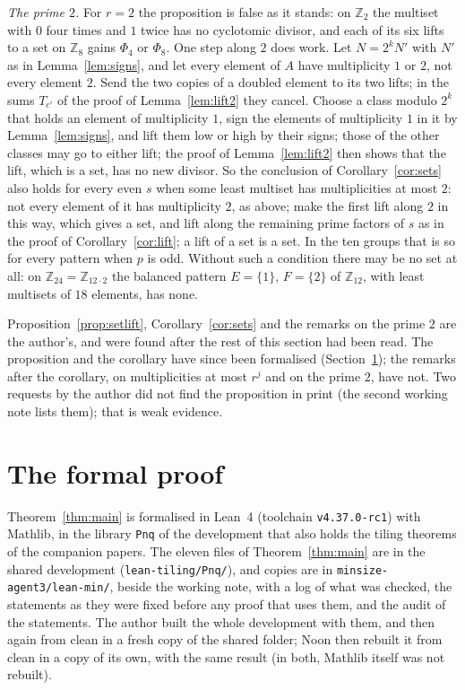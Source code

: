 \documentclass[11pt,a4paper]{amsart}
\theoremstyle{definition}
\theoremstyle{remark}
\newcommand{\Z}{\mathbb{Z}}
\newcommand{\lean}[1]{\texttt{#1}}
\begin{document}
\emph{The prime $2$.} For $r=2$ the proposition is false as it stands: on $\Z_2$ the multiset with $0$ four times and $1$
twice has no cyclotomic divisor, and each of its six lifts to a set on $\Z_8$ gains $\Phi_4$ or $\Phi_8$. One step along $2$ does
work. Let $N=2^kN'$ with $N'$ as in Lemma~\ref{lem:signs}, and let every element of $A$ have multiplicity $1$ or $2$, not every
element $2$. Send the two copies of a doubled element to its two lifts; in the sums $T_{c'}$ of the proof of
Lemma~\ref{lem:lift2} they cancel. Choose a class modulo $2^k$ that holds an element of multiplicity $1$, sign the elements of
multiplicity $1$ in it by Lemma~\ref{lem:signs}, and lift them low or high by their signs; those of the other classes may go to either lift; the proof of Lemma~\ref{lem:lift2}
then shows that the lift, which is a set, has no new divisor. So the conclusion of Corollary~\ref{cor:sets} also holds for every even $s$ when some least multiset has multiplicities at most $2$: not every element of it has multiplicity $2$, as above; make the first lift along $2$ in this way, which gives a set, and lift along the remaining prime factors of $s$ as in the proof of Corollary~\ref{cor:lift}; a lift of a set is a set. In the ten groups that is so for every pattern when $p$ is odd. Without
such a condition there may be no set at all: on $\Z_{24}=\Z_{12\cdot2}$ the balanced pattern $E=\{1\}$, $F=\{2\}$ of $\Z_{12}$,
with least multisets of $18$ elements, has none.

Proposition~\ref{prop:setlift}, Corollary~\ref{cor:sets} and the remarks on the prime $2$ are the author's, and were found after the rest of this section had been read. The proposition and the corollary have since been formalised (Section~\ref{sec:lean}); the remarks after the corollary, on multiplicities at most $r^j$ and on the prime $2$, have not. Two requests by the author did not find the
proposition in print (the second working note lists them); that is weak evidence.

\section{The formal proof}\label{sec:lean}

Theorem~\ref{thm:main} is formalised in Lean~4 (toolchain \lean{v4.37.0-rc1}) with Mathlib, in the library
\lean{Pnq} of the development that also holds the tiling theorems of the companion papers. The eleven files of Theorem~\ref{thm:main} are in the shared development (\lean{lean-tiling/Pnq/}), and copies are in
\lean{minsize-agent3/lean-min/}, beside the working note, with a log of what was checked, the statements as they were fixed before any proof that uses them, and the audit of the statements. The author
built the whole development with them, and then again from clean in a fresh copy of the shared folder; Noon then rebuilt it from clean in a copy of its own, with the same result (in both, Mathlib itself was not rebuilt).
\end{document}
